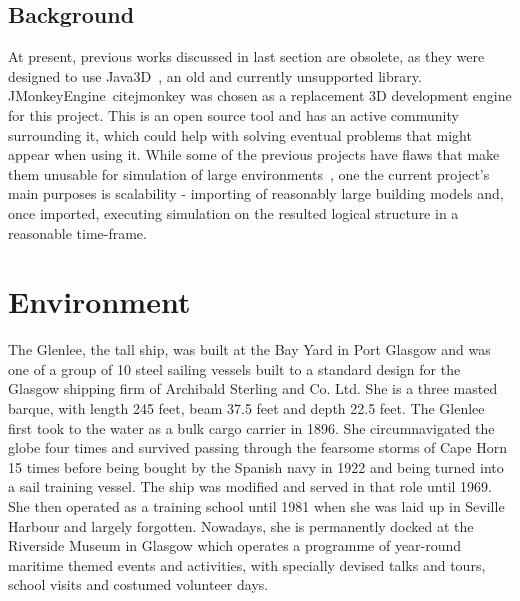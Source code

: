 \subsection{Background}
At present, previous works discussed in last section are obsolete, as they were designed to use Java3D~\cite{java3D},
an old and currently unsupported library. JMonkeyEngine~cite{jmonkey} was chosen as a
replacement 3D development engine for this project. This is an open source
tool and has an active community surrounding it, which could help with solving
eventual problems that might appear when using it.
While some of the previous projects have flaws that make them unusable for
simulation of large environments~\cite{glasgowUSimulator}, one the current project’s main purposes is
scalability - importing of reasonably large building models and, once imported,
executing simulation on the resulted logical structure in a reasonable time-frame.

\section{Environment}
The Glenlee, the tall ship, was built at the Bay Yard in Port Glasgow and was one of a group of 10 steel sailing vessels 
built to a standard design for the Glasgow shipping firm of Archibald Sterling and Co. Ltd. 
She is a three masted barque, with length 245 feet, beam 37.5 feet and depth 22.5 feet.
The Glenlee first took to the water as a bulk cargo carrier in 1896. She circumnavigated the globe four times
and survived passing through the fearsome storms of Cape Horn 15 times before 
being bought by the Spanish navy in 1922 and being turned into a sail training vessel. 
The ship was modified and served in that role until 1969. She then operated as a training school until 1981 
when she was laid up in Seville Harbour and largely forgotten.
Nowadays, she is permanently docked at the Riverside Museum in Glasgow which operates a programme of year-round maritime 
themed events and activities, with specially devised talks and tours, school visits and costumed volunteer days.

